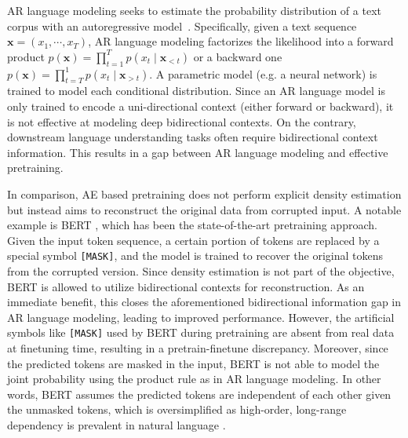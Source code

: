 \documentclass{article}
\begin{document}
AR language modeling seeks to estimate the probability distribution of a text corpus with an autoregressive model~\cite{dai2015semi,peters2018deep,radford2018improving}.
Specifically, given a text sequence $\mathbf{x} = (x_1, \cdots, x_T)$, AR language modeling factorizes the likelihood into a forward product $p(\mathbf{x}) = \prod_{t=1}^{T} p(x_t \mid \mathbf{x}_{<t})$ or a backward one $p(\mathbf{x}) = \prod_{t=T}^{1} p(x_t \mid \mathbf{x}_{>t})$.
A parametric model (e.g. a neural network) is trained to model each conditional distribution.
Since an AR language model is only trained to encode a uni-directional context (either forward or backward), it is not effective at modeling deep bidirectional contexts.
On the contrary, downstream language understanding tasks often require bidirectional context information. This results in a gap between AR language modeling and effective pretraining.

In comparison, AE based pretraining does not perform explicit density estimation but instead aims to reconstruct the original data from corrupted input.
A notable example is BERT \cite{devlin2018bert}, which has been the state-of-the-art pretraining approach.
Given the input token sequence, a certain portion of tokens are replaced by a special symbol \texttt{[MASK]}, and the model is trained to recover the original tokens from the corrupted version.
Since density estimation is not part of the objective, BERT is allowed to utilize bidirectional contexts for reconstruction.
As an immediate benefit, this closes the aforementioned bidirectional information gap in AR language modeling, leading to improved performance.
However, the artificial symbols like \texttt{[MASK]} used by BERT during pretraining are absent from real data at finetuning time, resulting in a pretrain-finetune discrepancy.
Moreover, since the predicted tokens are masked in the input, BERT is not able to model the joint probability using the product rule as in AR language modeling. In other words, BERT assumes the predicted tokens are independent of each other given the unmasked tokens, which is oversimplified as high-order, long-range dependency is prevalent in natural language \cite{dai2019transformer}.
\end{document}
